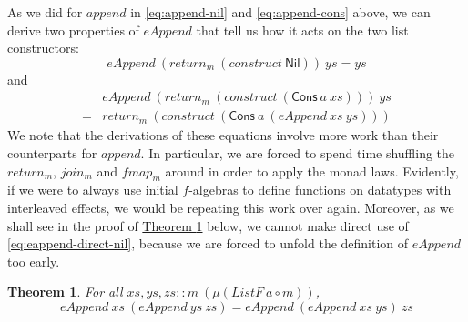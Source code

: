 \documentclass{jfp1}
\newtheorem{theorem}{Theorem}
\newcommand{\thmref}[1]{\hyperref[#1]{Theorem \ref*{#1}}}
\begin{document}
As we did for $\mathit{append}$ in \autoref{eq:append-nil} and
\autoref{eq:append-cons} above, we can derive two properties of
$\mathit{eAppend}$ that tell us how it acts on the two list
constructors:
\begin{equation}
  \label{eq:eappend-direct-nil}
  \mathit{eAppend}~(\mathit{return}_m~(\mathit{construct}~\mathsf{Nil}))~\mathit{ys} = \mathit{ys}
\end{equation}
and
\begin{equation}\label{eq:eappend-direct-cons}
  \begin{array}{cl}
    & \mathit{eAppend}~(\mathit{return}_m~(\mathit{construct}~(\mathsf{Cons}~a~\mathit{xs})))~\mathit{ys} \\ 
    =&\mathit{return}_m~(\mathit{construct}~(\mathsf{Cons}~a~(\mathit{eAppend}~\mathit{xs}~\mathit{ys})))
  \end{array}
\end{equation}
We note that the derivations of these equations involve more work
than their counterparts for $\mathit{append}$. In particular, we are
forced to spend time shuffling the $\mathit{return_m}$,
$\mathit{join_m}$ and $\mathit{fmap_m}$ around in order to apply the
monad laws. Evidently, if we were to always use initial $f$-algebras
to define functions on datatypes with interleaved effects, we would be
repeating this work over again. Moreover, as we shall see in the proof
of \thmref{thm:direct-eappend-assoc} below, we cannot make direct use
of \autoref{eq:eappend-direct-nil}, because we are forced to unfold
the definition of $\mathit{eAppend}$ too early.

\begin{theorem}\label{thm:direct-eappend-assoc}
  For all $\mathit{xs}, \mathit{ys}, \mathit{zs} :: m~(\mu (\mathit{ListF}~a \circ m))$,
  \begin{displaymath}
    \mathit{eAppend}~\mathit{xs}~(\mathit{eAppend}~\mathit{ys}~\mathit{zs}) = \mathit{eAppend}~(\mathit{eAppend}~\mathit{xs}~\mathit{ys})~\mathit{zs}
  \end{displaymath}
\end{theorem}
\end{document}
